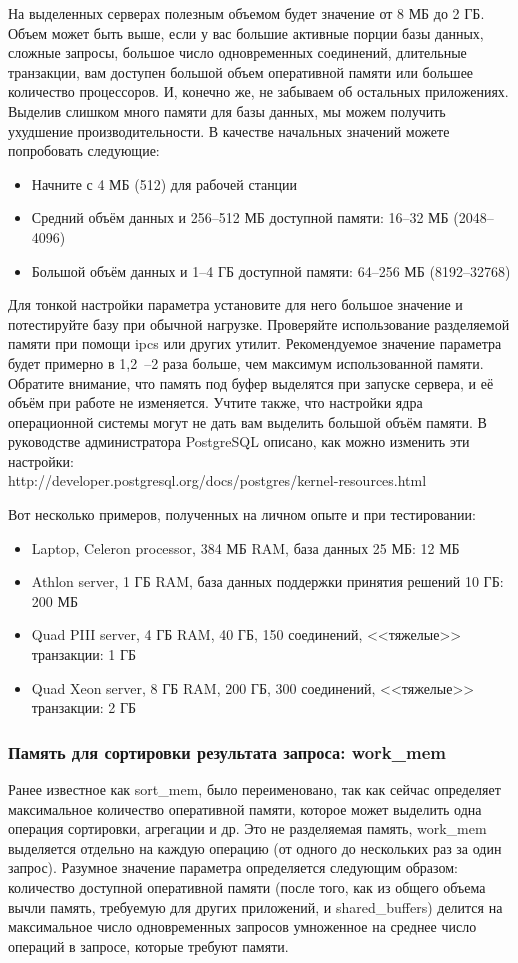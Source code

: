 На выделенных серверах полезным объемом будет значение от 8 МБ до 2 ГБ. 
Объем может быть выше, если у вас большие активные порции базы данных, сложные запросы, большое число 
одновременных соединений, длительные транзакции, вам доступен большой объем оперативной памяти или большее количество 
процессоров. И, конечно же, не забываем об остальных приложениях. Выделив слишком много памяти для базы данных, 
мы можем получить ухудшение производительности. 
В качестве начальных значений можете попробовать следующие:
\begin{itemize}
\item Начните с 4 МБ (512) для рабочей станции
\item Средний объём данных и 256--512 МБ доступной памяти: 16--32 МБ (2048--4096)
\item Большой объём данных и 1--4 ГБ доступной памяти: 64--256 МБ (8192--32768)
\end{itemize}

Для тонкой настройки параметра установите для него большое значение и потестируйте базу при обычной нагрузке. 
Проверяйте использование разделяемой памяти при помощи ipcs или других утилит. Рекомендуемое значение параметра 
будет примерно в 1,2~--2 раза больше, чем максимум использованной памяти. Обратите внимание, что память под буфер 
выделятся при запуске сервера, и её объём при работе не изменяется. Учтите также, что настройки ядра операционной 
системы могут не дать вам выделить большой объём памяти. В руководстве администратора PostgreSQL описано, как 
можно изменить эти настройки: \\http://developer.postgresql.org/docs/postgres/kernel-resources.html

Вот несколько примеров, полученных на личном опыте и при тестировании:
\begin{itemize}
\item Laptop, Celeron processor, 384 МБ RAM, база данных 25 МБ: 12 МБ
\item Athlon server, 1 ГБ RAM, база данных поддержки принятия решений 10 ГБ: 200 МБ
\item Quad PIII server, 4 ГБ RAM, 40 ГБ, 150 соединений, <<тяжелые>> транзакции: 1 ГБ
\item Quad Xeon server, 8 ГБ RAM, 200 ГБ, 300 соединений, <<тяжелые>> транзакции: 2 ГБ
\end{itemize}

\subsubsection{Память для сортировки результата запроса: work\_mem}
Ранее известное как sort\_mem, было переименовано, так как сейчас определяет максимальное количество оперативной памяти, 
которое может выделить одна операция сортировки, агрегации и др. Это не разделяемая память, work\_mem выделяется отдельно 
на каждую операцию (от одного до нескольких раз за один запрос). Разумное значение параметра определяется следующим образом: 
количество доступной оперативной памяти (после того, как из общего объема вычли память, требуемую для других приложений, и 
shared\_buffers) делится на максимальное число одновременных запросов умноженное на среднее число операций в запросе, которые 
требуют памяти.


